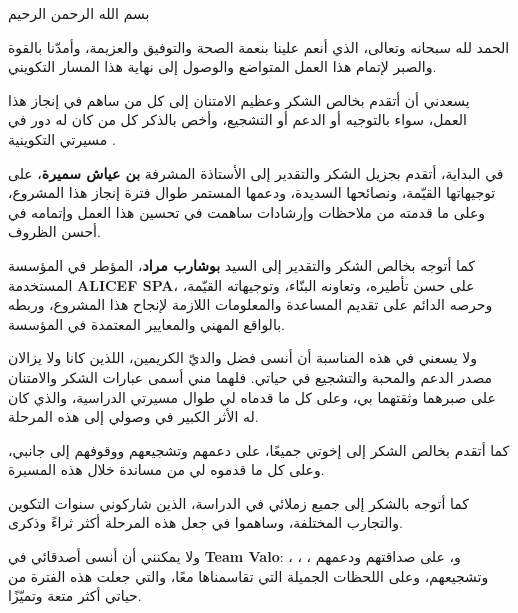 \documentclass{bts-report-ar}
\begin{document}
\setRTL

\maketitlepage

\setcounter{page}{1}

\begin{shokr}
بسم الله الرحمن الرحيم

الحمد لله سبحانه وتعالى، الذي أنعم علينا بنعمة الصحة والتوفيق والعزيمة، وأمدّنا بالقوة والصبر لإتمام هذا العمل المتواضع والوصول إلى نهاية هذا المسار التكويني.

يسعدني أن أتقدم بخالص الشكر وعظيم الامتنان إلى كل من ساهم في إنجاز هذا العمل، سواء بالتوجيه أو الدعم أو التشجيع، وأخص بالذكر كل من كان له دور في مسيرتي التكوينية .

في البداية، أتقدم بجزيل الشكر والتقدير إلى الأستاذة المشرفة \textbf{بن عياش سميرة}، على توجيهاتها القيّمة، ونصائحها السديدة، ودعمها المستمر طوال فترة إنجاز هذا المشروع، وعلى ما قدمته من ملاحظات وإرشادات ساهمت في تحسين هذا العمل وإتمامه في أحسن الظروف.

كما أتوجه بخالص الشكر والتقدير إلى السيد \textbf{بوشارب مراد}، المؤطر في المؤسسة المستخدمة \textbf{ALICEF SPA}، على حسن تأطيره، وتعاونه البنّاء، وتوجيهاته القيّمة، وحرصه الدائم على تقديم المساعدة والمعلومات اللازمة لإنجاح هذا المشروع، وربطه بالواقع المهني والمعايير المعتمدة في المؤسسة.

ولا يسعني في هذه المناسبة أن أنسى فضل والديّ الكريمين، اللذين كانا ولا يزالان مصدر الدعم والمحبة والتشجيع في حياتي. فلهما مني أسمى عبارات الشكر والامتنان على صبرهما وثقتهما بي، وعلى كل ما قدماه لي طوال مسيرتي الدراسية، والذي كان له الأثر الكبير في وصولي إلى هذه المرحلة.

كما أتقدم بخالص الشكر إلى إخوتي جميعًا، على دعمهم وتشجيعهم ووقوفهم إلى جانبي، وعلى كل ما قدموه لي من مساندة خلال هذه المسيرة.

كما أتوجه بالشكر إلى جميع زملائي في الدراسة، الذين شاركوني سنوات التكوين والتجارب المختلفة، وساهموا في جعل هذه المرحلة أكثر ثراءً وذكرى.

ولا يمكنني أن أنسى أصدقائي في \textbf{Team Valo}: ، ، ،  و، على صداقتهم ودعمهم وتشجيعهم، وعلى اللحظات الجميلة التي تقاسمناها معًا، والتي جعلت هذه الفترة من حياتي أكثر متعة وتميّزًا.


\end{shokr}
\end{document}
